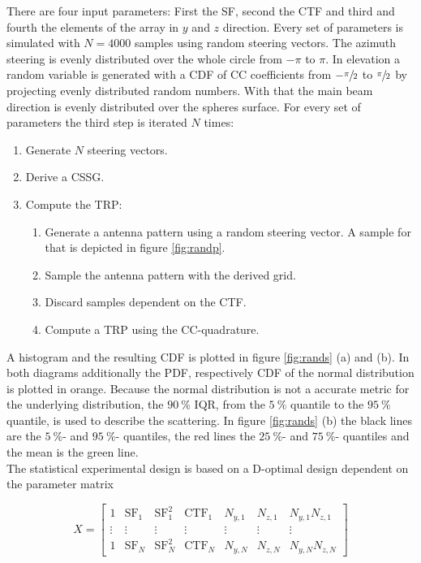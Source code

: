 There are four input parameters: First the \ac{SF}, second the \ac{CTF} and third and fourth the elements of the array in $y$ and $z$ direction. Every set of parameters is simulated with $N=4000$ samples using random steering vectors. The azimuth steering is evenly distributed over the whole circle from $-\pi$ to $\pi$. In elevation a random variable is generated with a \ac{CDF} of \ac{CC} coefficients from $-\sfrac{\pi}{2}$ to $\sfrac{\pi}{2}$ by projecting evenly distributed random numbers. With that the main beam direction is evenly distributed over the spheres surface. For every set of parameters the third step is iterated $N$ times:

\begin{enumerate}
\item Generate $N$ steering vectors.
\item Derive a \ac{CSSG}.
\item Compute the \ac{TRP}:
\begin{enumerate}
\item Generate a antenna pattern using a random steering vector. A sample for that is depicted in figure \ref{fig:randp}.
\item Sample the antenna pattern with the derived grid.
\item Discard samples dependent on the \ac{CTF}.
\item Compute a \ac{TRP} using the \ac{CC}-quadrature.
\end{enumerate}
\end{enumerate}

A histogram and the resulting \ac{CDF} is plotted in figure \ref{fig:rands} (a) and (b). In both diagrams additionally the \ac{PDF}, respectively \ac{CDF} of the normal distribution is plotted in orange. Because the normal distribution is not a accurate metric for the underlying distribution, the $\SI{90}{\percent}$ \ac{IQR}, from the $\SI{5}{\percent}$ quantile to the $\SI{95}{\percent}$ quantile, is used to describe the scattering. In figure \ref{fig:rands} (b) the black lines are the $\SI{5}{\percent}$- and $\SI{95}{\percent}$- quantiles, the red lines the $\SI{25}{\percent}$- and $\SI{75}{\percent}$- quantiles and the mean is the green line.\\
The statistical experimental design is based on a D-optimal design dependent on the parameter matrix

\begin{equation}
X = \begin{bmatrix}
1 & \text{SF}_1 & \text{SF}_1^2 & \text{CTF}_1 & N_{y,1} & N_{z,1} & N_{y,1}N_{z,1}\\
\vdots & \vdots & \vdots & \vdots & \vdots & \vdots & \vdots\\
1 & \text{SF}_N & \text{SF}_N^2 & \text{CTF}_N & N_{y,N} & N_{z,N} & N_{y,N}N_{z,N}
\end{bmatrix}
\label{eq:parammatrix}
\end{equation}

